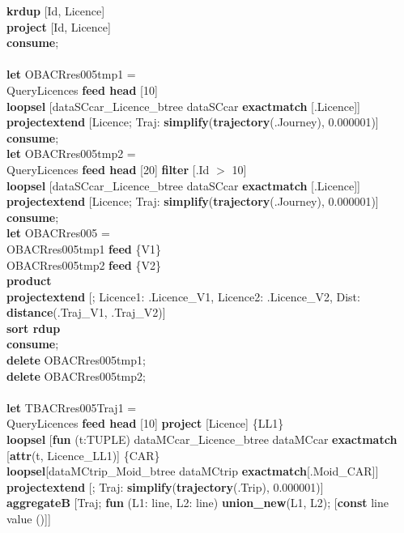 \documentclass[a4paper]{article}
\newcommand{\op}[1]{\textbf{#1}}
\begin{document}
\begin{scriptsize}
\begin{tabbing}
\>\op{krdup} [Id, Licence]\\
\>\op{project} [Id, Licence]\\
\op{consume};\\
\\
\op{let} OBACRres005tmp1 =\\
\>QueryLicences \op{feed head} [10]\\
\>\op{loopsel} [dataSCcar\_Licence\_btree dataSCcar \op{exactmatch} [.Licence]]\\
\>\op{projectextend} [Licence; Traj: \op{simplify}(\op{trajectory}(.Journey), 0.000001)]\\
\op{consume};\\
\op{let} OBACRres005tmp2 =\\
\>QueryLicences \op{feed head} [20] \op{filter} [.Id $>$ 10]\\
\>\op{loopsel} [dataSCcar\_Licence\_btree dataSCcar \op{exactmatch} [.Licence]]\\
\>\op{projectextend} [Licence; Traj: \op{simplify}(\op{trajectory}(.Journey), 0.000001)]\\
\op{consume};\\
\op{let} OBACRres005 = \\
\>OBACRres005tmp1 \op{feed} \{V1\}\\
\>OBACRres005tmp2 \op{feed} \{V2\}\\
\>\op{product}\\
\>\op{projectextend} [; Licence1: .Licence\_V1, Licence2: .Licence\_V2, Dist: \op{distance}(.Traj\_V1, .Traj\_V2)]\\
\>\op{sort rdup}\\
\op{consume};\\
\op{delete} OBACRres005tmp1;\\
\op{delete} OBACRres005tmp2;\\
\\
\op{let} TBACRres005Traj1 =\\
\>QueryLicences \op{feed head} [10] \op{project} [Licence] \{LL1\}\\
\>\op{loopsel} [\op{fun} (t:TUPLE) dataMCcar\_Licence\_btree dataMCcar \op{exactmatch} [\op{attr}(t, Licence\_LL1)] \{CAR\}\\
\>\>\op{loopsel}[dataMCtrip\_Moid\_btree dataMCtrip \op{exactmatch}[.Moid\_CAR]]\\
\>\>\op{projectextend} [; Traj: \op{simplify}(\op{trajectory}(.Trip), 0.000001)]\\
\>\>\op{aggregateB} [Traj; \op{fun} (L1: line, L2: line) \op{union\_new}(L1, L2); [\op{const} line value ()]]\\

\end{tabbing}
\end{scriptsize}
\end{document}
